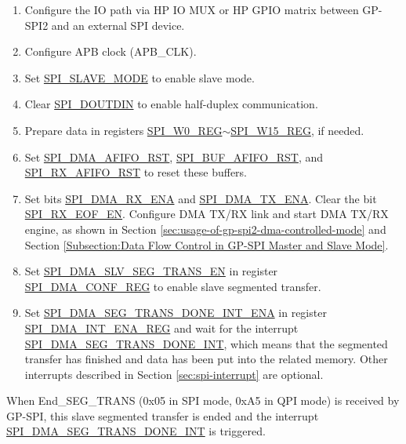 \documentclass[main\_\_EN.tex]{subfiles}
\begin{document}
\begin{enumerate}
   \item Configure the IO path via HP IO MUX or HP GPIO matrix between GP-SPI2 and an external SPI device.

   \item Configure APB clock (APB\_CLK).

    \item Set \hyperref[fielddesc:SPISLAVEMODE]{SPI\_SLAVE\_MODE} to enable slave mode.

    \item Clear \hyperref[fielddesc:SPIDOUTDIN]{SPI\_DOUTDIN} to enable half-duplex communication.

    \item Prepare data in registers \hyperref[regdesc:SPIW0REG]{SPI\_W0\_REG}$\sim$\hyperref[regdesc:SPIW15REG]{SPI\_W15\_REG}, if needed.

    \item Set \hyperref[fielddesc:SPIDMAAFIFORST]{SPI\_DMA\_AFIFO\_RST}, \hyperref[fielddesc:SPIBUFAFIFORST]{SPI\_BUF\_AFIFO\_RST}, and \hyperref[fielddesc:SPIRXAFIFORST]{SPI\_RX\_AFIFO\_RST} to reset these buffers.

    \item Set bits \hyperref[fielddesc:SPIDMARXENA]{SPI\_DMA\_RX\_ENA} and \hyperref[fielddesc:SPIDMATXENA]{SPI\_DMA\_TX\_ENA}. Clear the bit \hyperref[fielddesc:SPIRXEOFEN]{SPI\_RX\_EOF\_EN}. Configure DMA TX/RX link and start DMA TX/RX engine, as shown in Section \ref{sec:usage-of-gp-spi2-dma-controlled-mode} and Section \ref{Subsection:Data Flow Control in GP-SPI Master and Slave Mode}.

    \item Set \hyperref[fielddesc:SPIDMASLVSEGTRANSEN]{SPI\_DMA\_SLV\_SEG\_TRANS\_EN}  in register \hyperref[regdesc:SPIDMACONFREG]{SPI\_DMA\_CONF\_REG} to enable slave segmented transfer.

    \item Set \hyperref[fielddesc:SPIDMASEGTRANSDONEINTENA]{SPI\_DMA\_SEG\_TRANS\_DONE\_INT\_ENA} in register \hyperref[regdesc:SPIDMAINTENAREG]{SPI\_DMA\_INT\_ENA\_REG} and wait for the interrupt \hyperref[int:SPIDMASEGTRANSDONEINT]{SPI\_DMA\_SEG\_TRANS\_DONE\_INT}, which means that the segmented transfer has finished and data has been put into the related memory. Other interrupts described in Section \ref{sec:spi-interrupt} are optional.
\end{enumerate}

When End\_SEG\_TRANS (0x05 in SPI mode, 0xA5 in QPI mode) is received by GP-SPI, this slave segmented transfer is ended and the interrupt \hyperref[int:SPIDMASEGTRANSDONEINT]{ SPI\_DMA\_SEG\_TRANS\_DONE\_INT} is triggered.
\end{document}
